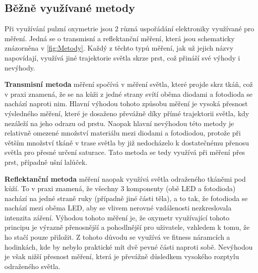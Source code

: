 \subsection {Běžně využívané metody}
Při využívání pulzní oxymetrie jsou 2 různá uspořádání elektroniky využívané pro měření. Jedná se o transmisní a reflektanční měření, která jsou schematicky znázorněna v \ref{fig:Metody}. Každý z těchto typů měření, jak už jejich názvy napovídají, využívá jiné trajektorie světla skrze prst, což přináší své výhody i nevýhody.
\par \textbf{Transmisní metoda} měření spočívá v měření světla, které projde skrz tkáň, což v praxi znamená, že se na kůži z jedné strany svítí oběma diodami a fotodioda se nachází naproti nim. Hlavní výhodou tohoto způsobu měření je vysoká přesnost výsledného měření, které je dosaženo převážně díky přímé trajektorii světla, kdy nezáleží na jeho odrazu od prstu. Naopak hlavní nevýhodou této metody je relativně omezené množství materiálu mezi diodami a fotodiodou, protože při větším množství tkáně v trase světla by již nedocházelo k dostatečnému přenosu světla pro přesné určení saturace. Tato metoda se tedy využívá při měření přes prst, případně ušní lalůček. %
\par \textbf{Reflektanční metoda} měření naopak využívá světla odraženého tkáněmi pod kůží. To v praxi znamená, že všechny 3 komponenty (obě LED a fotodioda) nachází na jedné straně ruky (případně jiné části těla), a to tak, že fotodioda se nachází mezi oběma LED, aby se vlivem nerovné vzdálenosti nezkreslovala intenzita záření. Výhodou tohoto měření je, že oxymetr využívající tohoto principu je výrazně přenosnější a pohodlnější pro uživatele, vzhledem k tomu, že ho stačí pouze přiložit. Z tohoto důvodu se využívá ve fitness náramcích a hodinkách, kde by nebylo praktické mít dvě pevné části naproti sobě. Nevýhodou je však nižší přesnost měření, která je převážně důsledkem vysokého rozptylu odraženého světla.
